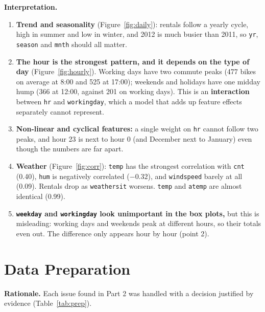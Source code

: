 \documentclass[11pt]{article}
\newcommand{\code}[1]{\texttt{#1}}
\begin{document}
\textbf{Interpretation.}
\begin{enumerate}
  \item \textbf{Trend and seasonality} (Figure~\ref{fig:daily}): rentals follow a yearly cycle, high in
        summer and low in winter, and 2012 is much busier than 2011, so \code{yr}, \code{season} and
        \code{mnth} should all matter.
  \item \textbf{The hour is the strongest pattern, and it depends on the type of day}
        (Figure~\ref{fig:hourly}). Working days have two commute peaks (477 bikes on average at 8:00 and 525 at 17:00);
        weekends and holidays have one midday hump (366 at 12:00, against 201 on working days).
        This is an \textbf{interaction} between \code{hr} and \code{workingday}, which a model that adds up
        feature effects separately cannot represent.
  \item \textbf{Non-linear and cyclical features:} a single weight on \code{hr} cannot follow two peaks,
        and hour 23 is next to hour 0 (and December next to January) even though the numbers are far apart.
  \item \textbf{Weather} (Figure~\ref{fig:corr}): \code{temp} has the strongest correlation with \code{cnt} (0.40),
        \code{hum} is negatively correlated ($-0.32$), and \code{windspeed} barely at all (0.09). Rentals drop as
        \code{weathersit} worsens. \code{temp} and \code{atemp} are almost identical (0.99).
  \item \textbf{\code{weekday} and \code{workingday} look unimportant in the box plots,} but this is misleading:
        working days and weekends peak at different hours, so their totals even out. The difference only
        appears hour by hour (point 2).
\end{enumerate}

\section{Data Preparation}

\textbf{Rationale.} Each issue found in Part 2 was handled with a decision justified by evidence
(Table~\ref{tab:prep}).
\end{document}
